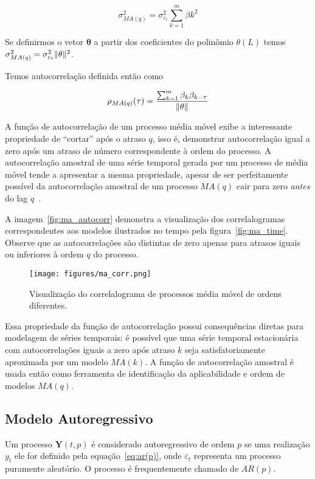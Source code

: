 $$\sigma^{2}_{MA(q)} = \sigma_{\varepsilon_t}^2 \sum^{m}_{k=1} \beta{k}^2 $$

Se definirmos o vetor $\mathbf{\theta}$ a partir dos coeficientes do polinômio
$\theta(L)$ temos $\sigma^{2}_{MA(q)} = \sigma_{\varepsilon_t}^2\lVert\mathbf{\theta}\rVert^2$.

Temos autocorrelação definida então como

$$\rho_{MA(q)}(\tau) = \frac{\sum^{m}_{k=1} \beta_k\beta_{k-\tau}}{\lVert\mathbf{\theta}\rVert}$$


A função de autocorrelação de um processo média móvel exibe a interessante
propriedade de ``cortar'' após o atraso $q$, isso é, demonstrar autocorrelação
igual a zero após um atraso de número correspondente à ordem do processo. A
autocorrelação amostral de uma série temporal gerada por um processo de média
móvel tende a apresentar a mesma propriedade, apesar de ser perfeitamente
possível da autocorrelação amostral de um processo $MA(q)$ cair para zero
\emph{antes} do lag $q$~\cite{chatfield}.

A imagem~\ref{fig:ma_autocorr} demonstra a visualização dos correlalogramas
correspondentes aos modelos ilustrados no tempo pela figura~\ref{fig:ma_time}.
Observe que as autocorrelações são distintas de zero apenas para atrasos
iguais ou inferiores à ordem $q$ do processo.

\begin{figure}[H]
    \centering
    \texttt{[image: figures/ma\_corr.png]}
    \caption{Visualização do correlalograma de processos média móvel de ordens
    diferentes.}
    \label{fig:ma_corr}
\end{figure}

Essa propriedade da função de autocorrelação possui consequências diretas para
modelagem de séries temporais: é possível que uma série temporal estacionária
com autocorrelações iguais a zero após atraso $k$ seja satisfatoriamente
aproximada por um modelo $MA(k)$. A função de autocorrelação amostral é usada
então como ferramenta de identificação da aplicabilidade e ordem de modelos
$MA(q)$.

\subsection{Modelo Autoregressivo}
\label{ssec:AR(p)}

Um processo ${\mathbf{Y}(t, p)}$ é considerado autoregressivo de ordem $p$ se
uma realização $y_t$ ele for definido pela equação~\ref{eq:ar(p)}, onde
$\varepsilon_t$ representa um processo puramente aleatório. O processo é
frequentemente chamado de $AR(p)$.

